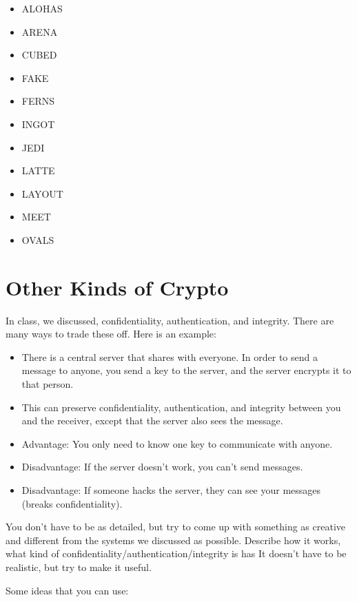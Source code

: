 \documentclass[12pt]{article}
\begin{document}
\begin{itemize}
\item ALOHAS 
\item ARENA 
\item CUBED 
\item FAKE 
\item FERNS 
\item INGOT 
\item JEDI 
\item LATTE   
\item LAYOUT 
\item MEET 
\item OVALS 
\end{itemize}

\section{Other Kinds of Crypto}

In class, we discussed, confidentiality, authentication, and integrity. There are many ways to trade these off. Here is an example:

\begin{itemize}
\item There is a central server that shares with everyone. In order to send a message to anyone, you send a key to the server, and the server encrypts it to that person.
\item This can preserve confidentiality, authentication, and integrity between you and the receiver, except that the server also sees the message.
\item Advantage: You only need to know one key to communicate with anyone.
\item Disadvantage: If the server doesn't work, you can't send messages.
\item Disadvantage: If someone hacks the server, they can see your messages (breaks confidentiality).
\end{itemize}

You don't have to be as detailed, but try to come up with something as creative and different from the systems we discussed as possible. Describe how it works, what kind of confidentiality/authentication/integrity is has
It doesn't have to be realistic, but try to make it useful.

Some ideas that you can use:
\end{document}
